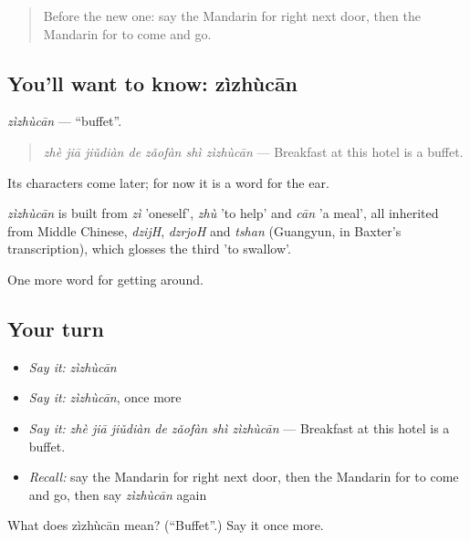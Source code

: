 \begin{quote}
Before the new one: say the Mandarin for right next door, then the Mandarin for to come and go.
\end{quote}

\subsection*{You'll want to know: zìzhùcān}
\emph{zìzhùcān} — \textquotedblleft{}buffet\textquotedblright{}.

\begin{quote}
\emph{zhè jiā jiǔdiàn de zǎofàn shì zìzhùcān} — Breakfast at this hotel is a buffet.
\end{quote}

Its characters come later; for now it is a word for the ear.

\begin{cousinweb}
\emph{zìzhùcān} is built from \emph{zì} 'oneself', \emph{zhù} 'to help' and \emph{cān} 'a meal', all inherited from Middle Chinese, \emph{dzijH}, \emph{dzrjoH} and \emph{tshan} (Guangyun, in Baxter's transcription), which glosses the third 'to swallow'.
\end{cousinweb}

\begin{grammarlens}[title={What you've built}]
One more word for getting around.
\end{grammarlens}

\subsection*{Your turn}
\begin{itemize}
\raggedright
  \item \emph{Say it:} \emph{zìzhùcān}
  \item \emph{Say it:} \emph{zìzhùcān}, once more
  \item \emph{Say it:} \emph{zhè jiā jiǔdiàn de zǎofàn shì zìzhùcān} — Breakfast at this hotel is a buffet.
  \item \emph{Recall:} say the Mandarin for right next door, then the Mandarin for to come and go, then say \emph{zìzhùcān} again
\end{itemize}

\begin{tcolorbox}[breakable,colback=teal!4,colframe=teal!35!black,title={Before you move on}]
What does zìzhùcān mean? (\textquotedblleft{}Buffet\textquotedblright{}.) Say it once more.
\end{tcolorbox}
